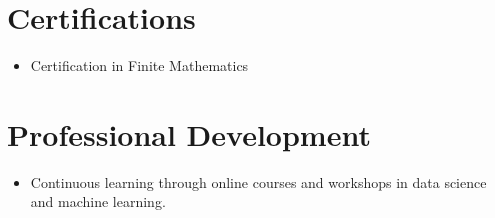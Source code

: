 \documentclass[10pt]{article}
\begin{document}
\vspace{-10pt}
\section*{Certifications}
\begin{itemize}
    \item Certification in Finite Mathematics
\end{itemize}

\vspace{-10pt}
\section*{Professional Development}
\begin{itemize}
    \item Continuous learning through online courses and workshops in data science and machine learning.
\end{itemize}
\end{document}
